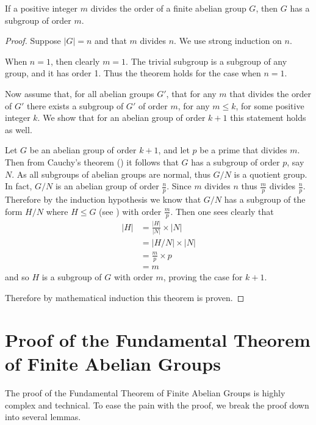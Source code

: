 \begin{theorem}
    If a positive integer $m$ divides the order of a finite abelian group $G$, then $G$ has a subgroup of order $m$.
\end{theorem}
\begin{proof}
    Suppose $|G| = n$ and that $m$ divides $n$. We use strong induction on $n$.

    When $n = 1$, then clearly $m = 1$. The trivial subgroup is a subgroup of any group, and it has order 1. Thus the theorem holds for the case when $n = 1$.

    Now assume that, for all abelian groups $G'$, that for any $m$ that divides the order of $G'$ there exists a subgroup of $G'$ of order $m$, for any $m \leq k$, for some positive integer $k$. We show that for an abelian group of order $k+1$ this statement holds as well.

    Let $G$ be an abelian group of order $k+1$, and let $p$ be a prime that divides $m$. Then from Cauchy's theorem () it follows that $G$ has a subgroup of order $p$, say $N$. As all subgroups of abelian groups are normal, thus $G/N$ is a quotient group. In fact, $G/N$ is an abelian group of order $\frac np$. Since $m$ divides $n$ thus $\frac mp$ divides $\frac np$. Therefore by the induction hypothesis we know that $G/N$ has a subgroup of the form $H/N$ where $H \leq G$ (see ) with order $\frac mp$. Then one sees clearly that
    \begin{align*}
        |H| &= \frac{|H|}{|N|} \times |N|\\
        &= |H/N| \times |N|\\
        &= \frac mp \times p\\
        &= m
    \end{align*}
    and so $H$ is a subgroup of $G$ with order $m$, proving the case for $k+1$.

    Therefore by mathematical induction this theorem is proven.
\end{proof}

\section{Proof of the Fundamental Theorem of Finite Abelian Groups}
The proof of the Fundamental Theorem of Finite Abelian Groups is highly complex and technical. To ease the pain with the proof, we break the proof down into several lemmas.

